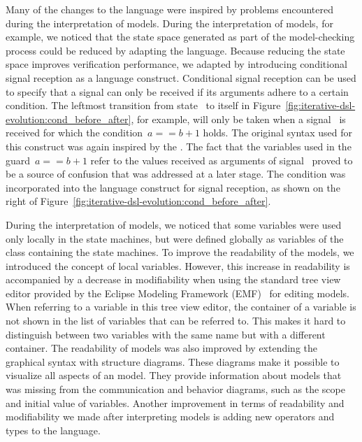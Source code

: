 Many of the changes to the language were inspired by problems encountered during the interpretation of models.
During the interpretation of \Promela models, for example, we noticed that the state space generated as part of the model-checking process could be reduced by adapting the language.
Because reducing the state space improves verification performance, we adapted \SLCO by introducing conditional signal reception as a language construct.
Conditional signal reception can be used to specify that a signal can only be received if its arguments adhere to a certain condition.
The leftmost transition from state~ to itself in Figure~\ref{fig:iterative-dsl-evolution:cond_before_after}, for example, will only be taken when a signal~ is received for which the condition~$a==b+1$ holds.
The original syntax used for this construct was again inspired by the \UML.
The fact that the variables used in the guard~$a==b+1$ refer to the values received as arguments of signal~ proved to be a source of confusion that was addressed at a later stage.
The condition was incorporated into the language construct for signal reception, as shown on the right of Figure~\ref{fig:iterative-dsl-evolution:cond_before_after}.

During the interpretation of \SLCO models, we noticed that some variables were used only locally in the state machines, but were defined globally as variables of the class containing the state machines.
To improve the readability of the models, we introduced the concept of local variables.
However, this increase in readability is accompanied by a decrease in modifiability when using the standard tree view editor provided by the Eclipse Modeling Framework (EMF)~\cite{Steinberg2008} for editing models.
When referring to a variable in this tree view editor, the container of a variable is not shown in the list of variables that can be referred to.
This makes it hard to distinguish between two variables with the same name but with a different container.
The readability of models was also improved by extending the graphical syntax with structure diagrams.
These diagrams make it possible to visualize all aspects of an \SLCO model.
They provide information about models that was missing from the communication and behavior diagrams, such as the scope and initial value of variables.
Another improvement in terms of readability and modifiability we made after interpreting \SLCO models is adding new operators and types to the language.

